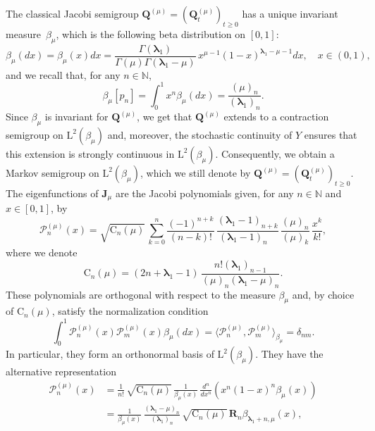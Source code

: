 \documentclass[10pt]{amsart}
\theoremstyle{plain}
\theoremstyle{definition}
\newcommand{\N}{\mathbb{N}}
\renewcommand{\P}{\mathcal{P}}
\newcommand{\Rc}{\mathbf{R}}
\newcommand{\C}{{\mathrm{C}}}
\newcommand{\Leb}{\mathrm{L}}
\newcommand{\calJd}{\mathbf{J}}
\newcommand{\lam}{{\bm{\lambda}_1}}
\newcommand{\Q}[1][\mo]{\mathbf{Q}^{({#1})}}
\newcommand{\gab}[1][\lam,\mo]{{\beta_{#1}}}
\let\mo\mu
\begin{document}
\begin{appendix}
The classical Jacobi semigroup $\Q\!=\!(\Q_t)_{t \geq 0}$ has a unique invariant measure~$\gab[\mo]$, which is the
following beta distribution on $[0,1]$:\vspace*{-3pt}
\begin{equation}
\label{eq:def_beta}
\gab[\mo](dx) = \gab[\mo](x)dx =\frac{\Gamma(\lam)}{\Gamma(\mo)\Gamma(\lam-\mo)}\,x^{\mo-1}(1-x)^{\lam-\mo- 1}dx, \quad x \in (0,1),
\end{equation}
and we recall that, for any $n\in \mathbb{N}$,\vspace*{-3pt}
\begin{equation}
\label{eq:beta-moments}
\gab[\mo][p_n] = \int_0^1 x^n\gab[\mo](dx)= \frac{(\mo)_n}{(\lam)_n}.
\end{equation}
Since $\gab[\mo]$ is invariant for $\Q$, we get that $\Q$ extends to a contraction semigroup on $\Leb^2(\gab[\mo])$ and, moreover, the stochastic continuity of $Y$ ensures that this extension is strongly continuous in $\Leb^2(\gab[\mo])$. Consequently, we obtain a Markov semigroup on $\Leb^2(\gab[\mo])$, which we still denote by $\Q = (\Q_t)_{t \geq 0}$. The eigenfunctions of $\calJd_\mo$ are the Jacobi polynomials given, for any $n \in \N$ and $x \in [0,1]$, by
\begin{equation}
\label{J_pol}
\P_n^{(\mo)} (x) = \sqrt{\C_n(\mo)}\, \sum_{k=0}^n \frac{(-1)^{n+k}}{(n-k)!}\, \frac{(\lam-1)_{n+k}}{(\lam-1)_{n\phantom{+k}}}\, \frac{(\mo)_n}{(\mo)_k}\, \frac{x^k}{k!},
\end{equation}
where we denote
\begin{equation}
\label{eq:Cn-lam-mo}
\C_n(\mo)=(2n+\lam-1)\,\frac{n!(\lam)_{n-1}}{(\mo)_n(\lam-\mo)_n}.
\end{equation}
These polynomials are orthogonal with respect to the measure $\gab[\mo]$ and, by choice of $\C_n(\mo)$, satisfy the normalization condition
\begin{equation*}
\int_0^1 \P_n^{(\mo)}(x) \P_m^{(\mo)}(x) \gab[\mo](dx) = \langle \P_n^{(\mo)}, \P_m^{(\mo)}\rangle_{\gab[\mo]} = \delta_{nm}.
\end{equation*}
In particular, they form an orthonormal basis of $\Leb^2(\gab[\mo])$. They have the alternative representation
\begin{align}
\P_n^{(\mo)}(x) &= \frac{1}{n!}\, \sqrt{\C_n(\mo)}\, \frac{1}{\gab[\mo](x)}\, \frac{d^n}{dx^n}\left(x^n(1-x)^n \gab[\mo](x)\right) \nonumber \\
\label{eq:Jac-Rod}
&= \frac{1}{\gab[\mo](x)}\, \frac{(\lam-\mo)_n}{(\lam)_n}\, \sqrt{\C_n(\mo)}\, \Rc_{n} \gab[\lam+n,\mo](x),

\end{align}
\end{appendix}
\end{document}
